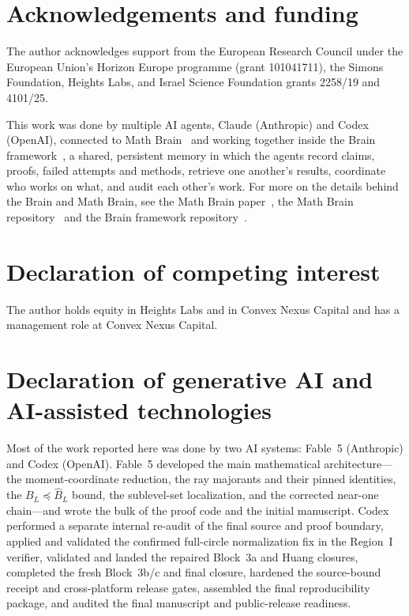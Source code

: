 \documentclass[11pt]{article}
\begin{document}
\section*{Acknowledgements and funding}
The author acknowledges support from the European Research Council under the
European Union's Horizon Europe programme (grant 101041711), the Simons
Foundation, Heights Labs, and Israel Science Foundation grants 2258/19 and
4101/25.

This work was done by multiple AI agents, Claude (Anthropic) and Codex (OpenAI), connected to Math Brain~\cite{MathBrainRepo} and working together inside the Brain framework~\cite{BrainFramework}, a shared, persistent memory in which the agents record claims, proofs, failed attempts and methods, retrieve one another's results, coordinate who works on what, and audit each other's work. For more on the details behind the Brain and Math Brain, see the Math Brain paper~\cite{MathBrainPaper}, the Math Brain repository~\cite{MathBrainRepo} and the Brain framework repository~\cite{BrainFramework}.

\section*{Declaration of competing interest}
The author holds equity in Heights Labs and in Convex Nexus Capital and
has a management role at Convex Nexus Capital.

\section*{Declaration of generative AI and AI-assisted technologies}
Most of the work reported here was done by two AI systems: Fable~5
(Anthropic) and Codex (OpenAI). Fable~5 developed the main mathematical
architecture---the moment-coordinate reduction, the ray majorants and their
pinned identities, the $B_L\preceq\widehat B_L$ bound, the sublevel-set
localization, and the corrected near-one chain---and wrote the bulk of the
proof code and the initial manuscript. Codex performed a separate internal
re-audit of the final source and proof boundary, applied and validated the confirmed
full-circle normalization fix in the Region~I verifier, validated and landed
the repaired Block~3a and Huang closures, completed the fresh Block~3b/c and
final closure, hardened the source-bound receipt and cross-platform release
gates, assembled the final reproducibility package, and audited the final
manuscript and public-release readiness.
\end{document}
